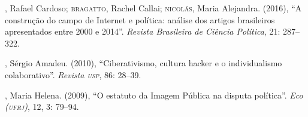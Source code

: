 \begin{bibliohedra}
, Rafael Cardoso; \textsc{bragatto}, Rachel Callai; \textsc{nicolás}, Maria
Alejandra. (2016), ``A construção do campo de Internet e política:
análise dos artigos brasileiros apresentados entre 2000 e 2014''.
\emph{Revista Brasileira de Ciência Política}, 21: 287--322.

, Sérgio Amadeu. (2010), ``Ciberativismo, cultura hacker e o
individualismo colaborativo''. \emph{Revista \textsc{usp}}, 86: 28--39.

, Maria Helena. (2009), ``O estatuto da Imagem Pública na disputa
política''. \emph{Eco (\textsc{ufrj})}, 12, 3: 79--94.
\end{bibliohedra}
